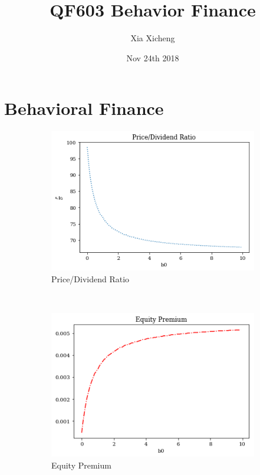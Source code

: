 \documentclass{article}
\title{QF603 Behavior Finance}
\date{Nov 24th 2018}
\author{Xia Xicheng}
\begin{document}
	\maketitle

\section{Behavioral Finance}


\begin{figure}[h]
	\centering
	\begin{subfigure}[b]{0.45\textwidth}
		\includegraphics[width=\textwidth]{output_9_0.png}
		\caption{Price/Dividend Ratio}
		\label{fig:pd_ratio}
	\end{subfigure}
	~ %
	\begin{subfigure}[b]{0.45\textwidth}
		\includegraphics[width=\textwidth]{output_9_1.png}
		\caption{Equity Premium}
		\label{fig:ep}
	\end{subfigure}
	\caption{}\label{fig:ts_PL}
\end{figure}
\end{document}
